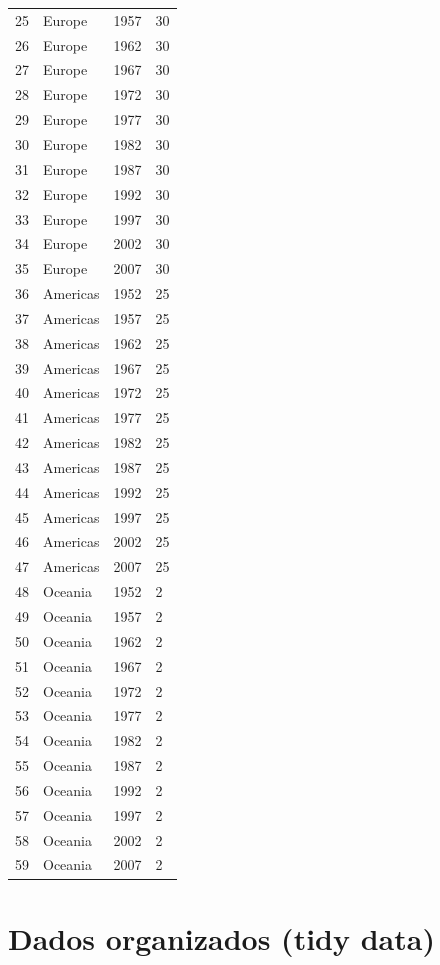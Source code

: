 \documentclass[
  portuguese,
  letterpaper,
  DIV=11,
  numbers=noendperiod]{scrreprt}
\theoremstyle{definition}
\theoremstyle{remark}
\begin{document}
\begin{longtable}[]{@{}llll@{}}
25 & Europe & 1957 & 30 \\
26 & Europe & 1962 & 30 \\
27 & Europe & 1967 & 30 \\
28 & Europe & 1972 & 30 \\
29 & Europe & 1977 & 30 \\
30 & Europe & 1982 & 30 \\
31 & Europe & 1987 & 30 \\
32 & Europe & 1992 & 30 \\
33 & Europe & 1997 & 30 \\
34 & Europe & 2002 & 30 \\
35 & Europe & 2007 & 30 \\
36 & Americas & 1952 & 25 \\
37 & Americas & 1957 & 25 \\
38 & Americas & 1962 & 25 \\
39 & Americas & 1967 & 25 \\
40 & Americas & 1972 & 25 \\
41 & Americas & 1977 & 25 \\
42 & Americas & 1982 & 25 \\
43 & Americas & 1987 & 25 \\
44 & Americas & 1992 & 25 \\
45 & Americas & 1997 & 25 \\
46 & Americas & 2002 & 25 \\
47 & Americas & 2007 & 25 \\
48 & Oceania & 1952 & 2 \\
49 & Oceania & 1957 & 2 \\
50 & Oceania & 1962 & 2 \\
51 & Oceania & 1967 & 2 \\
52 & Oceania & 1972 & 2 \\
53 & Oceania & 1977 & 2 \\
54 & Oceania & 1982 & 2 \\
55 & Oceania & 1987 & 2 \\
56 & Oceania & 1992 & 2 \\
57 & Oceania & 1997 & 2 \\
58 & Oceania & 2002 & 2 \\
59 & Oceania & 2007 & 2 \\
\end{longtable}

\section{Dados organizados (tidy
data)}\label{dados-organizados-tidy-data}
\end{document}
